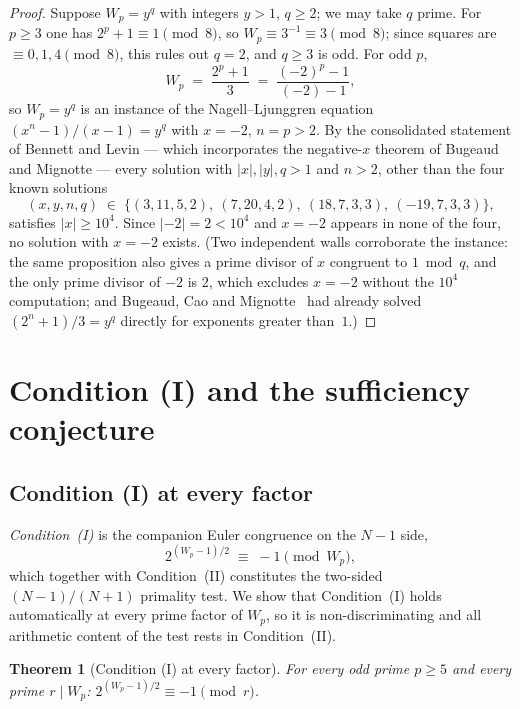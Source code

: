 \documentclass[11pt]{amsart}
\theoremstyle{plain}
\newtheorem{theorem}{Theorem}[section]
\theoremstyle{definition}
\theoremstyle{remark}
\numberwithin{equation}{section}
\begin{document}
\begin{proof}
Suppose $W_p = y^q$ with integers $y > 1$, $q \geq 2$; we may take $q$ prime. For $p \geq 3$ one has $2^p + 1 \equiv 1 \pmod 8$, so $W_p \equiv 3^{-1} \equiv 3 \pmod 8$; since squares are $\equiv 0, 1, 4 \pmod 8$, this rules out $q = 2$, and $q \geq 3$ is odd. For odd $p$,
\[
  W_p \;=\; \frac{2^p + 1}{3} \;=\; \frac{(-2)^p - 1}{(-2) - 1},
\]
so $W_p = y^q$ is an instance of the Nagell--Ljunggren equation $(x^n - 1)/(x - 1) = y^q$ with $x = -2$, $n = p > 2$. By the consolidated statement of Bennett and Levin \cite[Proposition~1]{ref:BennettLevin} --- which incorporates the negative-$x$ theorem of Bugeaud and Mignotte \cite{ref:BugeaudMignotte2002} --- every solution with $|x|, |y|, q > 1$ and $n > 2$, other than the four known solutions
\[
  (x, y, n, q) \;\in\; \{(3, 11, 5, 2),\ (7, 20, 4, 2),\ (18, 7, 3, 3),\ (-19, 7, 3, 3)\},
\]
satisfies $|x| \geq 10^4$. Since $|{-2}| = 2 < 10^4$ and $x = -2$ appears in none of the four, no solution with $x = -2$ exists. (Two independent walls corroborate the instance: the same proposition also gives a prime divisor of $x$ congruent to $1 \bmod q$, and the only prime divisor of $-2$ is $2$, which excludes $x = -2$ without the $10^4$ computation; and Bugeaud, Cao and Mignotte~\cite{ref:BugeaudCaoMignotte2001} had already solved $(2^n + 1)/3 = y^q$ directly for exponents greater than~$1$.)
\end{proof}

\section{Condition (I) and the sufficiency conjecture}

\subsection{Condition (I) at every factor}

\emph{Condition~(I)} is the companion Euler congruence on the $N - 1$ side,
\[
  2^{(W_p - 1)/2} \;\equiv\; -1 \pmod{W_p},
\]
which together with Condition~(II) constitutes the two-sided $(N-1)/(N+1)$ primality test. We show that Condition~(I) holds automatically at every prime factor of $W_p$, so it is non-discriminating and all arithmetic content of the test rests in Condition~(II).

\begin{theorem}[Condition (I) at every factor]\label{thm:condI}
For every odd prime $p \geq 5$ and every prime $r \mid W_p$: $2^{(W_p - 1)/2} \equiv -1 \pmod r$.
\end{theorem}
\end{document}
